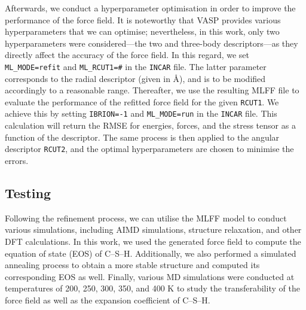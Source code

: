 Afterwards, we conduct a hyperparameter optimisation in order to improve the performance of the force field. It is noteworthy that VASP provides various hyperparameters that we can optimise; nevertheless, in this work, only two hyperparameters were considered---the two and three-body descriptors---as they directly affect the accuracy of the force field. In this regard, we set \texttt{ML\_MODE=refit} and \texttt{ML\_RCUT1=\#} in the \texttt{INCAR} file. The latter parameter corresponds to the radial descriptor (given in \AA), and is to be modified accordingly to a reasonable range. Thereafter, we use the resulting MLFF file to evaluate the performance of the refitted force field for the given \texttt{RCUT1}. We achieve this by setting \texttt{IBRION=-1} and \texttt{ML\_MODE=run} in the \texttt{INCAR} file. This calculation will return the RMSE for energies, forces, and the stress tensor as a function of the descriptor. The same process is then applied to the angular descriptor \texttt{RCUT2}, and the optimal hyperparameters are chosen to minimise the errors. 

\subsection{Testing}
Following the refinement process, we can utilise the MLFF model to conduct various simulations, including AIMD simulations, structure relaxation, and other DFT calculations. In this work, we used the generated force field to compute the equation of state (EOS) of  C--S--H. Additionally, we also performed a simulated annealing process to obtain a more stable structure and computed its corresponding EOS as well. Finally, various MD simulations were conducted at temperatures of 200, 250, 300, 350, and 400 K to study the transferability of the force field as well as the expansion coefficient of  C--S--H.
